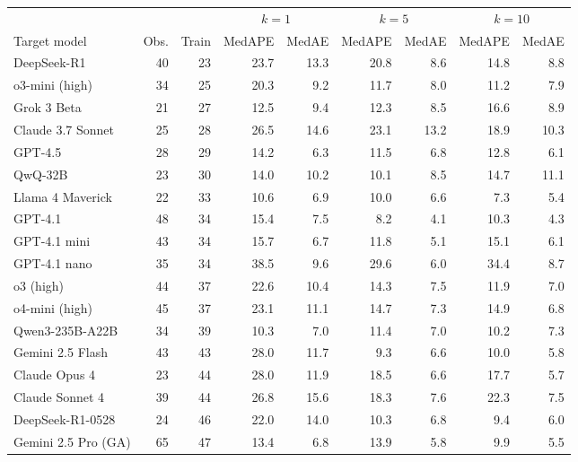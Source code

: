 \begin{tabular}{@{}l r r rr rr rr@{}}
\toprule
& & & \multicolumn{2}{c}{$k = 1$} & \multicolumn{2}{c}{$k = 5$} & \multicolumn{2}{c}{$k = 10$} \\
\cmidrule(lr){4-5} \cmidrule(lr){6-7} \cmidrule(lr){8-9}
Target model & Obs. & Train & MedAPE & MedAE & MedAPE & MedAE & MedAPE & MedAE \\
\midrule
DeepSeek-R1                    & 40 & 23 & 23.7 & 13.3 & 20.8 & 8.6 & 14.8 & 8.8 \\
o3-mini (high)                 & 34 & 25 & 20.3 & 9.2 & 11.7 & 8.0 & 11.2 & 7.9 \\
Grok 3 Beta                    & 21 & 27 & 12.5 & 9.4 & 12.3 & 8.5 & 16.6 & 8.9 \\
Claude 3.7 Sonnet              & 25 & 28 & 26.5 & 14.6 & 23.1 & 13.2 & 18.9 & 10.3 \\
GPT-4.5                        & 28 & 29 & 14.2 & 6.3 & 11.5 & 6.8 & 12.8 & 6.1 \\
QwQ-32B                        & 23 & 30 & 14.0 & 10.2 & 10.1 & 8.5 & 14.7 & 11.1 \\
Llama 4 Maverick               & 22 & 33 & 10.6 & 6.9 & 10.0 & 6.6 & 7.3 & 5.4 \\
GPT-4.1                        & 48 & 34 & 15.4 & 7.5 & 8.2 & 4.1 & 10.3 & 4.3 \\
GPT-4.1 mini                   & 43 & 34 & 15.7 & 6.7 & 11.8 & 5.1 & 15.1 & 6.1 \\
GPT-4.1 nano                   & 35 & 34 & 38.5 & 9.6 & 29.6 & 6.0 & 34.4 & 8.7 \\
o3 (high)                      & 44 & 37 & 22.6 & 10.4 & 14.3 & 7.5 & 11.9 & 7.0 \\
o4-mini (high)                 & 45 & 37 & 23.1 & 11.1 & 14.7 & 7.3 & 14.9 & 6.8 \\
Qwen3-235B-A22B                & 34 & 39 & 10.3 & 7.0 & 11.4 & 7.0 & 10.2 & 7.3 \\
Gemini 2.5 Flash               & 43 & 43 & 28.0 & 11.7 & 9.3 & 6.6 & 10.0 & 5.8 \\
Claude Opus 4                  & 23 & 44 & 28.0 & 11.9 & 18.5 & 6.6 & 17.7 & 5.7 \\
Claude Sonnet 4                & 39 & 44 & 26.8 & 15.6 & 18.3 & 7.6 & 22.3 & 7.5 \\
DeepSeek-R1-0528               & 24 & 46 & 22.0 & 14.0 & 10.3 & 6.8 & 9.4 & 6.0 \\
Gemini 2.5 Pro (GA)            & 65 & 47 & 13.4 & 6.8 & 13.9 & 5.8 & 9.9 & 5.5 \\

\end{tabular}

